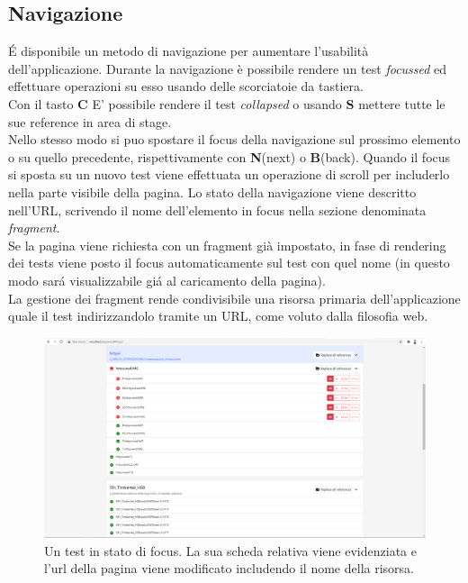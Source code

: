        \subsection{Navigazione}
            \'E disponibile un metodo di navigazione per aumentare l'usabilità dell'applicazione.
            Durante la navigazione è possibile rendere un test \textit{focussed} ed effettuare operazioni su esso usando delle scorciatoie da tastiera.\\
            Con il tasto \textbf{C} E' possibile rendere il test \textit{collapsed} o usando \textbf{S} mettere tutte le sue reference in area di stage.\\ 
            Nello stesso modo si puo spostare il focus della navigazione sul prossimo elemento o su quello precedente, rispettivamente con \textbf{N}(next) o \textbf{B}(back).
            Quando il focus si sposta su un nuovo test viene effettuata un operazione di scroll per includerlo nella parte visibile della pagina.
            Lo stato della navigazione viene descritto nell'URL, scrivendo il nome dell'elemento in focus nella sezione denominata \textit{fragment}.\\
            Se la pagina viene richiesta con un fragment già impostato, in fase di rendering dei tests viene posto il focus automaticamente sul test con quel nome (in questo modo sar\'a visualizzabile gi\'a al caricamento della pagina).\\
            La gestione dei fragment rende condivisibile una risorsa primaria dell'applicazione quale il test indirizzandolo tramite un URL, come voluto dalla filosofia web. 
            
            \begin{figure}[h]
                \includegraphics[width=\textwidth]{images/active.png}
                \caption{Un test in stato di focus. La sua scheda relativa viene evidenziata e l'url della pagina viene modificato includendo il nome della risorsa.}
            \end{figure}

